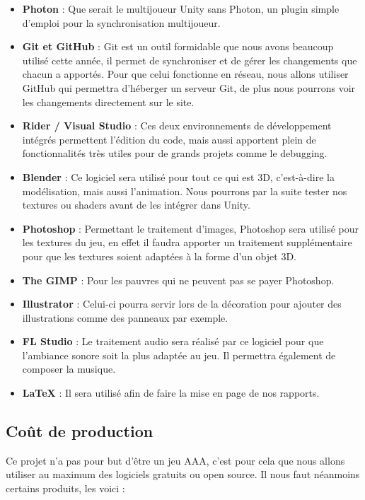 \documentclass{article}
\begin{document}
\begin{itemize}
	\item \textbf{Photon} : Que serait le multijoueur Unity sans Photon, un plugin simple d’emploi pour la synchronisation multijoueur. 
	\item \textbf{Git et GitHub} : Git est un outil formidable que nous avons beaucoup utilisé cette année, il permet de synchroniser et de gérer les changements que chacun a apportés. Pour que celui fonctionne en réseau, nous allons utiliser GitHub qui permettra d'héberger un serveur Git, de plus nous pourrons voir les changements directement sur le site.
	\item \textbf{Rider / Visual Studio} : Ces deux environnements de développement intégrés permettent l'édition du code, mais aussi apportent plein de fonctionnalités très utiles pour de grands projets comme le debugging.
	\item \textbf{Blender} : Ce logiciel sera utilisé pour tout ce qui est 3D, c’est-à-dire la modélisation, mais aussi l’animation. Nous pourrons par la suite tester nos textures ou shaders avant de les intégrer dans Unity.
	\item \textbf{Photoshop} : Permettant le traitement d’images, Photoshop sera utilisé pour les textures du jeu, en effet il faudra apporter un traitement supplémentaire pour que les textures soient adaptées à la forme d’un objet 3D.
	\item \textbf{The GIMP} : Pour les pauvres qui ne peuvent pas se payer Photoshop.
	\item \textbf{Illustrator} : Celui-ci pourra servir lors de la décoration pour ajouter des illustrations comme des panneaux par exemple.
	\item \textbf{FL Studio} : Le traitement audio sera réalisé par ce logiciel pour que l’ambiance sonore soit la plus adaptée au jeu. Il permettra également de composer la musique.
	\item \textbf{LaTeX} : Il sera utilisé afin de faire la mise en page de nos rapports.
\end{itemize}

\subsection{Coût de production}

Ce projet n'a pas pour but d'être un jeu AAA, c'est pour cela que nous allons utiliser au maximum des logiciels gratuits ou open source.
Il nous faut néanmoins certains produits, les voici :
\end{document}

